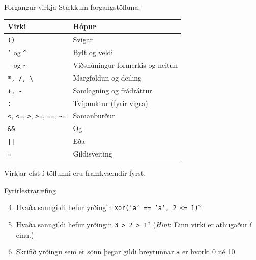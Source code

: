 \documentclass[handout]{beamer}
\begin{document}
\begin{frame}{Forgangur virkja}
Stækkum forgangstöfluna:
\begin{center}
\small
\begin{tabular}{ll}
\toprule
Virki&Hópur\\
\midrule
\texttt{()}&Svigar\\
\texttt{'} og \texttt{\^}&Bylt og veldi\\
\texttt{-} og \texttt{\~{}}&Viðsnúningur formerkis og neitun\\
\texttt{*, /, \textbackslash}&Margföldun og deiling\\
\texttt{+, -}&Samlagning og frádráttur\\
\texttt{:}&Tvípunktur (fyrir vigra)\\
\texttt{<}, \texttt{<=}, \texttt{>}, \texttt{>=}, \texttt{==}, \texttt{\~{}=}&Samanburður\\
\texttt{\&\&}&Og\\
\texttt{||}&Eða\\
\texttt{=}&Gildisveiting\\
\bottomrule
\end{tabular}
\end{center}
Virkjar efst í töflunni eru framkvæmdir fyrst.
\end{frame}

\begin{frame}{Fyrirlestraræfing}
\begin{enumerate}
\setcounter{enumi}{3}
 \item Hvaða sanngildi hefur yrðingin \texttt{xor('a' == 'a', 2 <= 1)}?
 \item Hvaða sanngildi hefur yrðingin \texttt{3 > 2 > 1}? (\emph{Hint}: Einn virki er athugaður í einu.)
 \item Skrifið yrðingu sem er sönn þegar gildi breytunnar \texttt{a} er hvorki 0 né 10.
\end{enumerate}
\end{frame}
\end{document}

